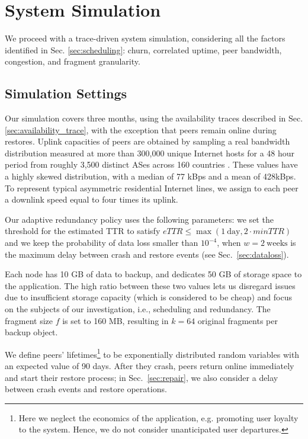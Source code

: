 \documentclass[conference,10pt]{IEEEtran}
\begin{document}
\section{System Simulation}
\label{sec:complex_sim}

We proceed with a trace-driven system simulation, considering all the factors identified in Sec. \ref{sec:scheduling}: churn, correlated uptime, peer bandwidth, congestion, and fragment granularity.

\subsection{Simulation Settings}

Our simulation covers three months, using the availability
traces described in Sec. \ref{sec:availability_trace}, with the
exception that peers remain online during restores. Uplink capacities
of peers are obtained by sampling a real bandwidth distribution
measured at more than 300,000 unique Internet hosts for a 48 hour
period from roughly 3,500 distinct ASes across 160
countries \cite{Piatek07doincentives}. These values have a highly
skewed distribution, with a median of 77 kBps and a mean of
428kBps. To represent typical asymmetric residential Internet lines,
we assign to each peer a downlink speed equal to four times its
uplink.

Our adaptive redundancy policy uses the following parameters: we set the threshold for the estimated TTR to satisfy $eTTR \leq \max\left(1~\mathrm{day}, 2 \cdot minTTR\right)$ and we keep the probability of data loss smaller than $10^{-4}$, when $w=2~\mathrm{weeks}$ is the maximum delay between crash and restore events (see Sec.~\ref{sec:dataloss}).

Each node has 10 GB of data to backup, and dedicates 50 GB of storage space
to the application. The high ratio between these two values
lets us disregard issues due to insufficient storage capacity (which
is considered to be cheap) and focus on the subjects of our
investigation, i.e., scheduling and redundancy. The fragment size $f$
is set to 160 MB, resulting in $k=64$ original fragments per backup
object.


We define peers' lifetimes\footnote{Here we neglect the economics of the application, e.g. promoting user loyalty to the system. Hence, we do not consider unanticipated user departures.} to be exponentially distributed random variables with an expected value of 90 days. After they crash, peers return online immediately and start their restore process; in Sec.~\ref{sec:repair}, we also consider a delay between crash events and restore operations.
\end{document}
